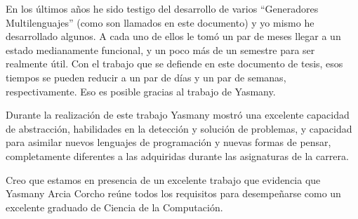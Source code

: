 \begin{opinion}
En los últimos años he sido testigo del desarrollo de varios ``Generadores
Multilenguajes'' (como son llamados en este documento) y yo mismo he
desarrollado algunos.  A cada uno de ellos le tomó un par de meses llegar
a un estado medianamente funcional, y un poco más de un semestre para ser
realmente útil.  Con el trabajo que se defiende en este documento de
tesis, esos tiempos se pueden reducir a un par de días y un par de
semanas, respectivamente.  Eso es posible gracias al trabajo de Yasmany.

Durante la realización de este trabajo Yasmany mostró una excelente
capacidad de abstracción, habilidades en la detección y solución de
problemas, y capacidad para asimilar nuevos lenguajes de programación y
nuevas formas de pensar, completamente diferentes a las adquiridas durante
las asignaturas de la carrera.

Creo que estamos en presencia de un excelente trabajo que evidencia que
Yasmany Arcia Corcho reúne todos los requisitos para desempeñarse como un
excelente graduado de Ciencia de la Computación.
\end{opinion}